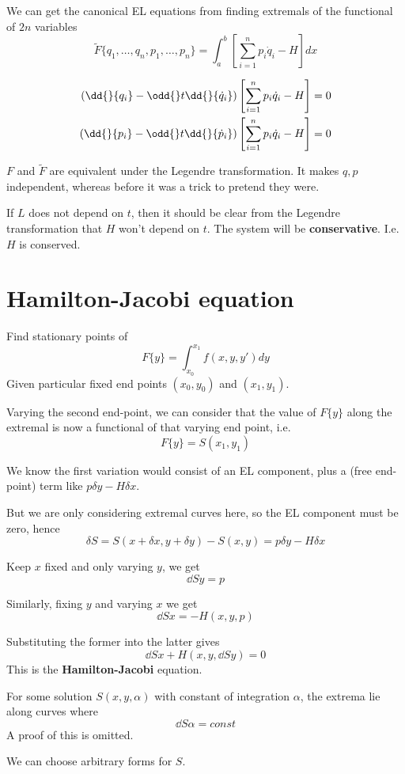 \documentclass{E:/Documents/Latex/myassignment}
\begin{document}
We can get the canonical EL equations from finding extremals of the functional of $2n$ variables 
\[\tilde F \{q_1,\ldots,q_n,p_1,\ldots,p_n\} = \int_a^b \left[\sum_{i=1}^n p_i\dot q_i - H\right] dx\]

\begin{align*}
	\left(\dd{}{q_i} - \odd{}t \dd{}{\dot q_i}\right) \left[ \sum_{i=1}^n p_i \dot q_i - H\right] = 0 \\
	\left(\dd{}{p_i} - \odd{}t \dd{}{\dot p_i}\right) \left[ \sum_{i=1}^n p_i \dot q_i - H\right] = 0
\end{align*}

$F$ and $\tilde{F}$ are equivalent under the Legendre transformation. It makes $q,p$ independent, whereas before it was a trick to pretend they were.

If $L$ does not depend on $t$, then it should be clear from the Legendre transformation that $H$ won't depend on $t$. The system will be \textbf{conservative}. I.e. $H$ is conserved.


\section{Hamilton-Jacobi equation}
Find stationary points of
\[F\{y\} = \int_{x_0}^{x_1} f(x,y,y') dy\]
Given particular fixed end points $(x_0,y_0)$ and $(x_1,y_1)$.

Varying the second end-point, we can consider that the value of $F\{y\}$ along the extremal is now a functional of that varying end point, i.e.
\[F\{y\} = S(x_1,y_1)\]

We know the first variation would consist of an EL component, plus a (free end-point) term like $p \delta y - H \delta x$.

But we are only considering extremal curves here, so the EL component must be zero, hence
\[\delta S = S(x+\delta x, y + \delta y) - S(x,y) = p \delta y - H \delta x\]

Keep $x$ fixed and only varying $y$, we get
\[\dd Sy = p\]

Similarly, fixing $y$ and varying $x$ we get
\[\dd S x = - H(x,y,p)\]

Substituting the former into the latter gives
\[\dd Sx + H\left(x,y,\dd Sy\right) = 0\]
This is the \textbf{Hamilton-Jacobi} equation.


For some solution $S(x,y,\alpha)$ with constant of integration $\alpha$, the extrema lie along curves where
\[\dd S \alpha = const\]
A proof of this is omitted.


We can choose arbitrary forms for $S$.
\end{document}
